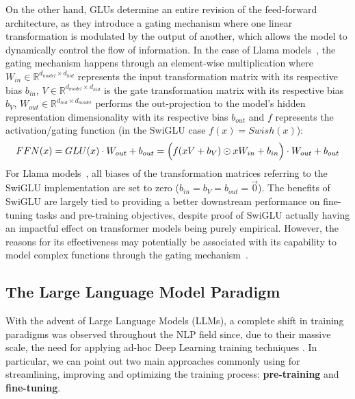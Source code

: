 On the other hand, GLUs determine an entire revision of the feed-forward architecture, as they introduce a gating mechanism where one linear transformation is modulated by the output of another, which allows the model to dynamically control the flow of information.
In the case of Llama models~\cite{touvron2023,dubey2024}, the gating mechanism happens through an element-wise multiplication where $W_{in} \in \mathbb{R}^{d_{model} \times d_{hid}}$ represents the input transformation matrix with its respective bias $b_{in}$, $V \in \mathbb{R}^{d_{model} \times d_{hid}}$ is the gate transformation matrix with its respective bias $b_{V}$, $W_{out} \in \mathbb{R}^{d_{hid} \times d_{model}}$ performs the out-projection to the model's hidden representation dimensionality with its respective bias $b_{out}$ and $f$ represents the activation/gating function (in the SwiGLU case $f(x) = Swish(x)$):
\begin{equation}
    \label{eq:background_ffnn}
    FFN(x) = GLU(x) \cdot W_{out} + b_{out} 
    = \Bigl( f(xV + b_V) \odot xW_{in} + b_{in} \Bigr) \cdot W_{out} + b_{out}
\end{equation}
For Llama models~\cite{touvron2023,dubey2024}, all biases of the transformation matrices referring to the SwiGLU implementation are set to zero ($b_{in} = b_V = b_{out} = \vec 0$).
The benefits of SwiGLU are largely tied to providing a better downstream performance on fine-tuning tasks and pre-training objectives, despite proof of SwiGLU actually having an impactful effect on transformer models being purely empirical.
However, the reasons for its effectiveness may potentially be associated with its capability to model complex functions through the gating mechanism~\cite{shazeer2020,shibuya2023}.

\subsection{The Large Language Model Paradigm}

With the advent of Large Language Models (LLMs), a complete shift in training paradigms was observed throughout the NLP field since, due to their massive scale, the need for applying ad-hoc Deep Learning training techniques .
In particular, we can point out two main approaches commonly using for streamlining, improving and optimizing the training process: \textbf{pre-training} and \textbf{fine-tuning}.


